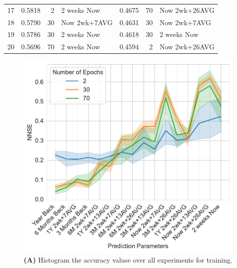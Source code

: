 \documentclass[utf8]{FrontiersinVancouver} %
\begin{document}
{\begin{table}[htb]
\begin{center}
{\begin{tabular}{|l||r|r|l|r|r|l|}
17 &  0.5818 &      2 &    2 weeks Now &  0.4675 &     70 &  Now 2wk+26AVG \\
18 &  0.5790 &     30 &   Now 2wk+7AVG &  0.4631 &     30 &   Now 2wk+7AVG \\
19 &  0.5786 &     30 &    2 weeks Now &  0.4618 &     30 &    2 weeks Now \\
20 &  0.5696 &     70 &    2 weeks Now &  0.4594 &      2 &  Now 2wk+26AVG \\
\hline
\end{tabular}
}
\end{center}
\end{table}




\begin{figure}[p]

  \begin{center}
     \begin{minipage}[t]{0.65\textwidth}
        \includegraphics[width=1.0\linewidth]{images/A100-NNSE-all-epochs-training.pdf}
        {\bf (A)} Histogram the accuracy valuse over all experiments for training.
     \end{minipage}
  \end{center}
  \ \
  \begin{center}
     \begin{minipage}[t]{0.65\textwidth}

\end{minipage}
\end{center}
\end{figure}}
\end{document}
